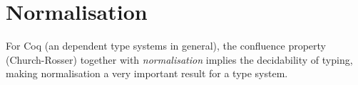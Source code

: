 \section{Normalisation}
For Coq (an dependent type systems in general), the confluence property
(Church-Rosser) together with \emph{normalisation} implies the decidability
of typing, making normalisation a very important result for a type system.

